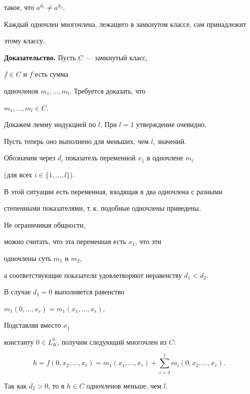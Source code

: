 такое, что $a^{d_1} \ne a^{d_2}$.


 


\begin{lem}


Каждый одночлен многочлена, лежащего в замкнутом классе, сам принадлежит


этому классу.


\end{lem}





{\bf Доказательство.} Пусть $C$ --- замкнутый класс, 


$f\in C$ и $f$ есть сумма


одночленов ${m_1},\dotsc,{m_l}$. Требуется доказать, что


$m_1,\dotsc,m_l\in C$.


Докажем лемму индукцией по $l$. При $l=1$ утверждение очевидно.


Пусть теперь оно выполнено для меньших, чем $l$, значений.


Обозначим через $d_i$ показатель переменной $x_1$ в одночлене $m_i$ 


(для всех $i\in \{1,\dotsc,l\}$).


В этой ситуации есть переменная, входящая в два одночлена с разными


степенными показателями, т.\,к. подобные одночлены приведены.


Не ограничивая общности, 


можно считать, что эта переменная есть $x_1$, что эти


одночлены суть $m_1$ и $m_2$, 


а соответствующие показатели удовлетворяют неравенству ${d_1}<{d_2}$.





В случае ${d_1}=0$ выполняется равенство


$m_1(0,\dotsc,x_r)=m_1(x_1,\dotsc,x_r)$.


Подставляя вместо ${x_1}$


константу $0\in {L^0_K}$, получим следующий многочлен из $C$:


$$


h=f(0,x_2,\dotsc,x_r)=m_1(x_1,\dotsc,x_r)


+\sum_{i=3}^l m_i(0,x_2,\dotsc,x_r).


$$


Так как ${d_2}>0$, то в $h\in C$ одночленов меньше, чем $l$.


